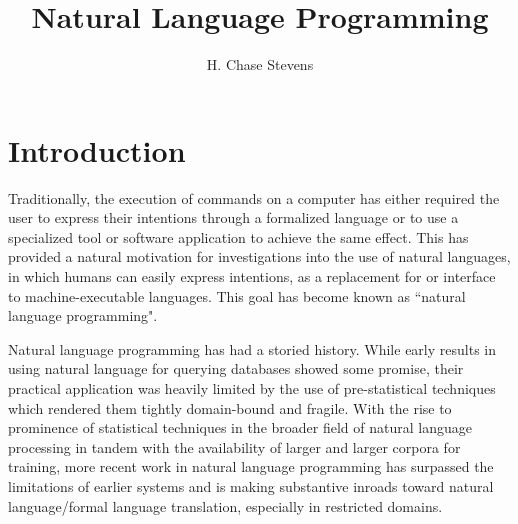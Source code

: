 \documentclass[a4paper,11pt]{proposal}
\title{Natural Language Programming}
\author{H. Chase Stevens}
\begin{document}
\maketitle 
\parindent=0mm


\setcounter{tocdepth}{2}

\clearpage
{}

\newpage


\setlength{\parskip}{1ex} 


\section{Introduction} \label{sec:intro}

Traditionally, the execution of commands on a computer has either required the user to express their intentions through a formalized language or to use a specialized tool or software application to achieve the same effect. This has provided a natural motivation for investigations into the use of natural languages, in which humans can easily express intentions, as a replacement for or interface to machine-executable languages. This goal has become known as ``natural language programming". 

Natural language programming has had a storied history. While early results in using natural language for querying databases showed some promise, their practical application was heavily limited by the use of pre-statistical techniques which rendered them tightly domain-bound and fragile. With the rise to prominence of statistical techniques in the broader field of natural language processing in tandem with the availability of larger and larger corpora for training, more recent work in natural language programming has surpassed the limitations of earlier systems and is making substantive inroads toward natural language/formal language translation, especially in restricted domains. 
\end{document}
